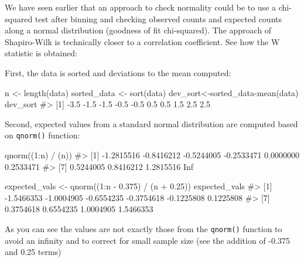 \documentclass[
  letterpaper,
  DIV=11,
  numbers=noendperiod]{scrreprt}
\newenvironment{Shaded}{\begin{snugshade}}{\end{snugshade}}
\newcommand{\CommentTok}[1]{\textcolor[rgb]{0.37,0.37,0.37}{#1}}
\newcommand{\DecValTok}[1]{\textcolor[rgb]{0.68,0.00,0.00}{#1}}
\newcommand{\FloatTok}[1]{\textcolor[rgb]{0.68,0.00,0.00}{#1}}
\newcommand{\FunctionTok}[1]{\textcolor[rgb]{0.28,0.35,0.67}{#1}}
\newcommand{\NormalTok}[1]{\textcolor[rgb]{0.00,0.23,0.31}{#1}}
\newcommand{\OtherTok}[1]{\textcolor[rgb]{0.00,0.23,0.31}{#1}}
\newcommand{\SpecialCharTok}[1]{\textcolor[rgb]{0.37,0.37,0.37}{#1}}
\begin{document}
We have seen earlier that an approach to check normality could be to use
a chi-squared test after binning and checking observed counts and
expected counts along a normal distribution (goodness of fit
chi-squared). The approach of Shapiro-Wilk is technically closer to a
correlation coefficient. See how the W statistic is obtained:

First, the data is sorted and deviations to the mean computed:

\begin{Shaded}
\begin{Highlighting}[]
\NormalTok{n }\OtherTok{\textless{}{-}} \FunctionTok{length}\NormalTok{(data)}
\NormalTok{sorted\_data }\OtherTok{\textless{}{-}} \FunctionTok{sort}\NormalTok{(data)}
\NormalTok{dev\_sort}\OtherTok{\textless{}{-}}\NormalTok{sorted\_data}\SpecialCharTok{{-}}\FunctionTok{mean}\NormalTok{(data)}
\NormalTok{dev\_sort}
\CommentTok{\#\textgreater{}  [1] {-}3.5 {-}1.5 {-}1.5 {-}0.5 {-}0.5  0.5  0.5  1.5  2.5  2.5}
\end{Highlighting}
\end{Shaded}

Second, expected values from a standard normal distribution are computed
based on \texttt{qnorm()} function:

\begin{Shaded}
\begin{Highlighting}[]
\FunctionTok{qnorm}\NormalTok{((}\DecValTok{1}\SpecialCharTok{:}\NormalTok{n) }\SpecialCharTok{/}\NormalTok{ (n))}
\CommentTok{\#\textgreater{}  [1] {-}1.2815516 {-}0.8416212 {-}0.5244005 {-}0.2533471  0.0000000  0.2533471}
\CommentTok{\#\textgreater{}  [7]  0.5244005  0.8416212  1.2815516        Inf}

\NormalTok{expected\_vals }\OtherTok{\textless{}{-}} \FunctionTok{qnorm}\NormalTok{((}\DecValTok{1}\SpecialCharTok{:}\NormalTok{n }\SpecialCharTok{{-}} \FloatTok{0.375}\NormalTok{) }\SpecialCharTok{/}\NormalTok{ (n }\SpecialCharTok{+} \FloatTok{0.25}\NormalTok{))}
\NormalTok{expected\_vals}
\CommentTok{\#\textgreater{}  [1] {-}1.5466353 {-}1.0004905 {-}0.6554235 {-}0.3754618 {-}0.1225808  0.1225808}
\CommentTok{\#\textgreater{}  [7]  0.3754618  0.6554235  1.0004905  1.5466353}
\end{Highlighting}
\end{Shaded}

As you can see the values are not exactly those from the
\texttt{qnorm()} function to avoid an infinity and to correct for small
sample size (see the addition of -0.375 and 0.25 terms)
\end{document}
